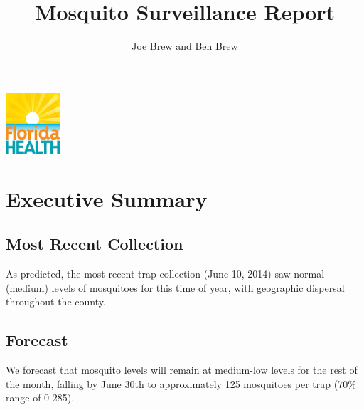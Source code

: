 \documentclass{article}
\begin{document}


\title{\textbf{Mosquito Surveillance Report}}
\author{Joe Brew and Ben Brew}


\maketitle
\tableofcontents

\vspace{40mm}

\begin{center}
\includegraphics[width=2cm]{doh}
\end{center}





\fancyhfoffset[E,O]{0pt}


\vspace*{30mm}
\section*{Executive Summary}
\hrulefill




\begin{multicols}{2} 


\subsection*{Most Recent Collection}

As predicted, the most recent trap collection (June 10, 2014) saw normal (medium) levels of mosquitoes for this time of year, with geographic dispersal throughout the county.  

\vfill
\columnbreak



\subsection*{Forecast}

We forecast that mosquito levels will remain at medium-low levels  for the rest of the month, falling by June 30th to approximately 125 mosquitoes per trap (70\% range of 0-285).  


\end{multicols}
\end{document}
